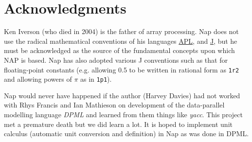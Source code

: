
\section{Acknowledgments}

  Ken Iverson (who died in 2004) is the father of array
  processing. Nap does not use the radical mathematical conventions of
  his languages 
  \href{http://www.acm.org/sigapl/}{APL}, and 
  \href{http://www.jsoftware.com/}{J}, but he must be
  acknowledged as the source of the fundamental concepts upon which NAP
  is based. Nap has also adopted various J conventions such as that for
  floating-point constants (e.g. allowing 0.5 to be written in rational
  form as 
  \texttt{1r2} and allowing powers of $\pi$ as in 
  \texttt{1p1}).
  \par Nap would never have happened if the author (Harvey Davies) had
  not worked with Rhys Francis and Ian Mathieson on development of the
  data-parallel modelling language 
  \textit{DPML} and learned from them things like 
  \textit{yacc}. This project met a premature death but we did learn a
  lot. It is hoped to implement unit calculus (automatic unit
  conversion and definition) in Nap as was done in DPML.

